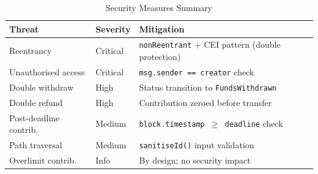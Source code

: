 \begin{table}[H]
\centering
\caption{Security Measures Summary}
\label{tab:securitysummary}
\begin{tabularx}{\textwidth}{l l X}
\toprule
\textbf{Threat} & \textbf{Severity} & \textbf{Mitigation} \\
\midrule
Reentrancy         & Critical & \texttt{nonReentrant} + CEI pattern (double protection) \\
Unauthorised access & Critical & \texttt{msg.sender == creator} check \\
Double withdraw    & High     & Status transition to \texttt{FundsWithdrawn} \\
Double refund      & High     & Contribution zeroed before transfer \\
Post-deadline contrib. & Medium & \texttt{block.timestamp $\geq$ deadline} check \\
Path traversal     & Medium   & \texttt{sanitiseId()} input validation \\
Overlimit contrib. & Info     & By design; no security impact \\
\bottomrule
\end{tabularx}
\end{table}
